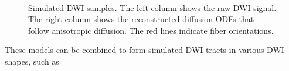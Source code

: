 \documentclass[twocolumn]{svjour3}
\begin{document}
\begin{figure}[ht]
  \centering {}
  \hspace*{0.7cm}
  \\
  \caption{Simulated DWI samples. The left column shows the raw DWI signal. The right
    column shows the reconstructed diffusion ODFs that follow anisotropic diffusion. The
    red lines indicate fiber orientations.}
  \label{fig:hardiandodf}
\end{figure}
These models can be combined to form simulated DWI tracts in various DWI shapes, such as
\end{document}
